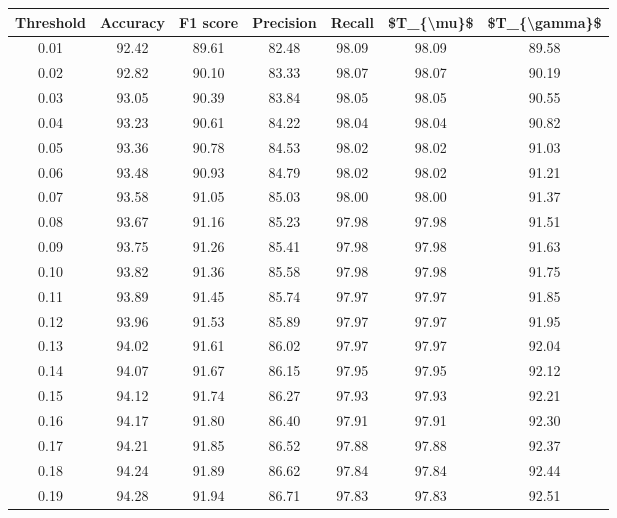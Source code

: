 \begin{tabular}{|c|c|c|c|c|c|c|}
\hline
 Threshold &  Accuracy &  F1 score &  Precision &  Recall &  \$T\_\{\textbackslash mu\}\$ &  \$T\_\{\textbackslash gamma\}\$ \\
\hline
      0.01 &     92.42 &     89.61 &      82.48 &   98.09 &      98.09 &         89.58 \\
      0.02 &     92.82 &     90.10 &      83.33 &   98.07 &      98.07 &         90.19 \\
      0.03 &     93.05 &     90.39 &      83.84 &   98.05 &      98.05 &         90.55 \\
      0.04 &     93.23 &     90.61 &      84.22 &   98.04 &      98.04 &         90.82 \\
      0.05 &     93.36 &     90.78 &      84.53 &   98.02 &      98.02 &         91.03 \\
      0.06 &     93.48 &     90.93 &      84.79 &   98.02 &      98.02 &         91.21 \\
      0.07 &     93.58 &     91.05 &      85.03 &   98.00 &      98.00 &         91.37 \\
      0.08 &     93.67 &     91.16 &      85.23 &   97.98 &      97.98 &         91.51 \\
      0.09 &     93.75 &     91.26 &      85.41 &   97.98 &      97.98 &         91.63 \\
      0.10 &     93.82 &     91.36 &      85.58 &   97.98 &      97.98 &         91.75 \\
      0.11 &     93.89 &     91.45 &      85.74 &   97.97 &      97.97 &         91.85 \\
      0.12 &     93.96 &     91.53 &      85.89 &   97.97 &      97.97 &         91.95 \\
      0.13 &     94.02 &     91.61 &      86.02 &   97.97 &      97.97 &         92.04 \\
      0.14 &     94.07 &     91.67 &      86.15 &   97.95 &      97.95 &         92.12 \\
      0.15 &     94.12 &     91.74 &      86.27 &   97.93 &      97.93 &         92.21 \\
      0.16 &     94.17 &     91.80 &      86.40 &   97.91 &      97.91 &         92.30 \\
      0.17 &     94.21 &     91.85 &      86.52 &   97.88 &      97.88 &         92.37 \\
      0.18 &     94.24 &     91.89 &      86.62 &   97.84 &      97.84 &         92.44 \\
      0.19 &     94.28 &     91.94 &      86.71 &   97.83 &      97.83 &         92.51 \\

\end{tabular}
